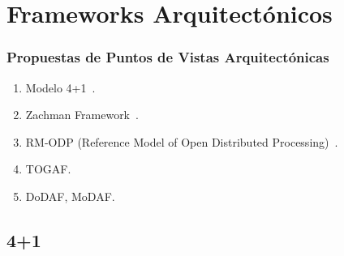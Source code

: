﻿\documentclass[handout,a4paper,slidestop,xcolor=pst,blue]{beamer}
\begin{document}
\section{Frameworks Arquitectónicos}

\begin{frame}[c]
	\frametitle{Propuestas de Puntos de Vistas Arquitectónicas}
	\begin{enumerate}[<+->]
		\item Modelo 4+1~\cite{krutchen:1995}.
		\item Zachman Framework~\cite{zachman:1987}.
		\item RM-ODP (Reference Model of Open Distributed Processing)~\cite{linington:2011}.
		\item TOGAF.
		\item DoDAF, MoDAF.
	\end{enumerate}
\end{frame}

\subsection{4+1}
\end{document}
